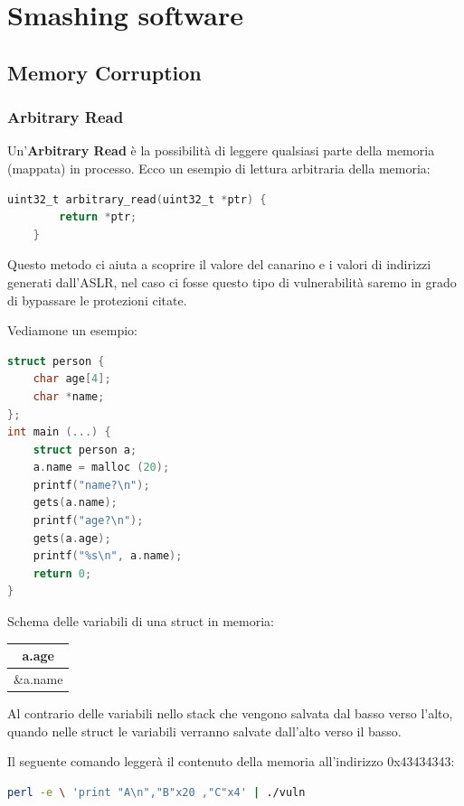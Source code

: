 \chapter{Smashing software}

\section{Memory Corruption}

\subsection{Arbitrary Read}
Un'\textbf{Arbitrary Read} è la possibilità di leggere qualsiasi parte della memoria (mappata) in processo.
Ecco un esempio di lettura arbitraria della memoria:
\begin{lstlisting}[language=C]
    uint32_t arbitrary_read(uint32_t *ptr) {
        return *ptr;
    }
\end{lstlisting}
Questo metodo ci aiuta a scoprire il valore del canarino e i valori di indirizzi generati dall'ASLR, nel caso ci fosse questo tipo di vulnerabilità saremo in grado di bypassare le protezioni citate.

Vediamone un esempio:
\begin{lstlisting}[language=C]
struct person {
    char age[4];
    char *name;
};
int main (...) {
    struct person a;
    a.name = malloc (20);
    printf("name?\n");
    gets(a.name);
    printf("age?\n");
    gets(a.age);
    printf("%s\n", a.name);
    return 0;
}
\end{lstlisting}
Schema delle variabili di una struct in memoria:
\newline

\begin{center}
    \begin{table}[h!]
        \centering
        \begin{tabular}{|c|}
            \hline
            a.age \\
            \hline
            \&a.name \\
            \hline
        \end{tabular}
    \end{table}
\end{center}

\begin{lema}[]{}{}
    Al contrario delle variabili nello stack che vengono salvata dal basso verso l'alto, quando nelle struct le variabili verranno salvate dall'alto verso il basso.
\end{lema}
Il seguente comando leggerà il contenuto della memoria all'indirizzo 0x43434343:
\begin{lstlisting}[language=bash]
    perl -e \ 'print "A\n","B"x20 ,"C"x4' | ./vuln
\end{lstlisting}


